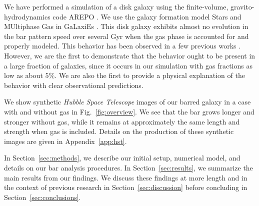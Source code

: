 \documentclass[fleqn,usenatbib]{mnras}
\newcommand{\RCR}{\ensuremath{R_{\textrm{CR}}}}
\newcommand{\Rot}{\ensuremath{\mathcal{R}}}
\begin{document}
We have performed a simulation of a disk galaxy using the finite-volume,
gravito-hydrodynamics code AREPO \citep{2010MNRAS.401..791S}. We use the galaxy
formation model Stars and MUltiphase Gas in GaLaxiEs
\citep[SMUGGLE;][]{2019MNRAS.489.4233M}. This disk galaxy exhibits almost no
evolution in the bar pattern speed over several Gyr when the gas phase is
accounted for and properly modeled. This behavior has been observed in a few
previous works \citep{1993AA...268...65F, 2010ApJ...719.1470V,
2014MNRAS.438L..81A}. However, we are the first to demonstrate that the behavior
ought to be present in a large fraction of galaxies, since it occurs in our
simulation with gas fractions as low as about $5\%$. We are also the first to
provide a physical explanation of the behavior with clear observational
predictions.

We show synthetic \textit{Hubble Space Telescope} images of our barred galaxy in
a case with and without gas in Fig.~\ref{fig:overview}. We see that the bar
grows longer and stronger without gas, while it remains at approximately the
same length and strength when gas is included. Details on the production of
these synthetic images are given in Appendix~\ref{app:hst}.


In Section~\ref{sec:methods}, we describe our initial setup, numerical model,
and details on our bar analysis procedures. In Section~\ref{sec:results}, we
summarize the main results from our findings. We discuss these findings at more
length and in the context of previous research in Section~\ref{sec:discussion}
before concluding in Section~\ref{sec:conclusions}.

\end{document}
